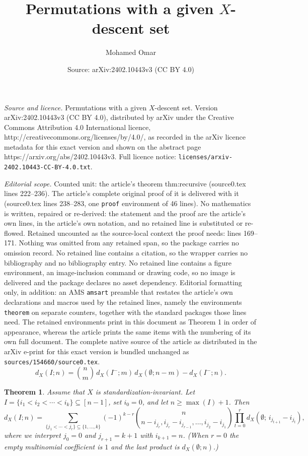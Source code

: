 \documentclass[10pt,a4paper]{amsart}
\title{Permutations with a given $X$-descent set}
\author{Mohamed Omar}
\date{Source: arXiv:2402.10443v3 (CC BY 4.0)}
\newtheorem{theorem}{Theorem}
\begin{document}
\maketitle

\noindent\emph{Source and licence.} Permutations with a given $X$-descent set. Version arXiv:2402.10443v3 (CC BY 4.0), distributed by arXiv under the Creative Commons Attribution 4.0 International licence, http://creativecommons.org/licenses/by/4.0/, as recorded in the arXiv licence metadata for this exact version and shown on the abstract page https://arxiv.org/abs/2402.10443v3. Full licence notice: \texttt{licenses/arxiv-2402.10443-CC-BY-4.0.txt}.\par\smallskip

\noindent\textit{Editorial scope.} Counted unit: the article's theorem thm:recursive (source0.tex lines 222--236). The article's complete original proof of it is delivered with it (source0.tex lines 238--283, one \texttt{proof} environment of 46 lines). No mathematics is written, repaired or re-derived: the statement and the proof are the article's own lines, in the article's own notation, and no retained line is substituted or re-flowed.  Retained uncounted as the source-local context the proof needs: lines 169--171.  Nothing was omitted from any retained span, so the package carries no omission record.  No retained line contains a citation, so the wrapper carries no bibliography and no bibliography entry.  No retained line contains a figure environment, an image-inclusion command or drawing code, so no image is delivered and the package declares no asset dependency.  Editorial formatting only, in addition: an AMS \texttt{amsart} preamble that restates the article's own declarations and macros used by the retained lines, namely the environments \texttt{theorem} on separate counters, together with the standard packages those lines need.  The retained environments print in this document as Theorem 1 in order of appearance, whereas the article prints the same items with the numbering of its own full document.  The complete native source of the article as distributed in the arXiv e-print for this exact version is bundled unchanged as \texttt{sources/154660/source0.tex}.
\begin{equation}\label{eq:recursion-binomial}
d_X(I;n)=\binom{n}{m}\,d_X(I^-;m)\,d_X(\emptyset;n-m)-d_X(I^-;n).
\end{equation}

\begin{theorem}\label{thm:recursive}
Assume that $X$ is standardization-invariant.
Let $I=\{i_1<i_2<\cdots<i_k\}\subseteq[n-1]$, set $i_0=0$, and let $n\ge \max(I)+1$.
Then
\begin{equation}\label{eq:IE-expanded}
d_X(I;n)
=
\sum_{\{j_1<\cdots<j_r\}\subseteq\{1,\dots,k\}}
(-1)^{k-r}
\binom{n}{n-i_{j_r},i_{j_r}-i_{j_{r-1}},\ldots,i_{j_2}-i_{j_1}}
\prod_{t=0}^{r} d_X\!\left(\emptyset;\,i_{j_{t+1}}-i_{j_t}\right),
\end{equation}
where we interpret $j_0=0$ and $j_{r+1}=k+1$ with $i_{k+1}=n$.
(When $r=0$ the empty multinomial coefficient is $1$ and the last product is $d_X(\emptyset;n)$.)
\end{theorem}
\end{document}
